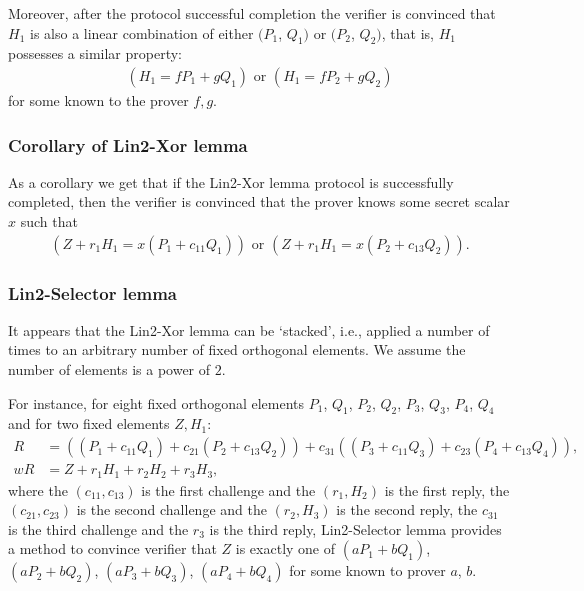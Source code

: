\documentclass{mathcryptology} %
\theoremstyle{title}
\theoremstyle{titleof}
\begin{document}
    Moreover, after the protocol successful completion the verifier is convinced that $H_{1}$ is also a linear combination of either $(P_{1}$, $Q_{1})$ or $(P_{2}$, $Q_{2})$, that is, $H_{1}$ possesses a similar property:
    \begin{align*}
        (H_{1}=fP_{1}+gQ_{1}) \text{ or } (H_{1}=fP_{2}+gQ_{2})
    \end{align*}          
    for some known to the prover $f, g$.
    
\subsubsection{Corollary of Lin2-Xor lemma}
    As a corollary we get that if the Lin2-Xor lemma protocol is successfully completed, then the verifier is convinced that the prover knows some secret scalar $x$ such that
    \begin{align*}
        (Z+r_{1}H_{1}=x(P_{1}+c_{11}Q_{1})) \text{ or } (Z+r_{1}H_{1}=x(P_{2}+c_{13}Q_{2})).
    \end{align*}       
    
\subsubsection{Lin2-Selector lemma}   
    It appears that the Lin2-Xor lemma can be `stacked', i.e., applied a number of times to an arbitrary number of fixed orthogonal elements. We assume the number of elements is a power of $2$. 
    
    For instance, for eight fixed orthogonal elements $P_{1}$, $Q_{1}$, $P_{2}$, $Q_{2}$, $P_{3}$, $Q_{3}$, $P_{4}$, $Q_{4}$ and for two fixed elements $Z, H_{1}$:
    \begin{align*}
        R & = \left( \left( P_{1}+c_{11}Q_{1}\right)+c_{21}\left(P_{2}+c_{13}Q_{2}\right) \right) + c_{31} \left( \left(P_{3}+c_{11}Q_{3}\right)+c_{23}\left(P_{4}+c_{13}Q_{4}\right)\right),\\
        wR & = Z+r_{1}H_{1}+r_{2}H_{2}+r_{3}H_{3},
    \end{align*}
    where the $(c_{11}, c_{13})$ is the first challenge and the $(r_{1}, H_{2})$ is the first reply, the $(c_{21}, c_{23})$ is the second challenge and the $(r_{2}, H_{3})$ is the second reply, the $c_{31}$ is the third challenge and the $r_{3}$ is the third reply, Lin2-Selector lemma provides a method to convince verifier that $Z$ is exactly one of $(a P_{1}+b Q_{1})$, $(a P_{2}+b Q_{2})$, $(aP_{3}+bQ_{3})$, $(aP_{4}+bQ_{4})$ for some known to prover $a$, $b$.
    
\end{document}
